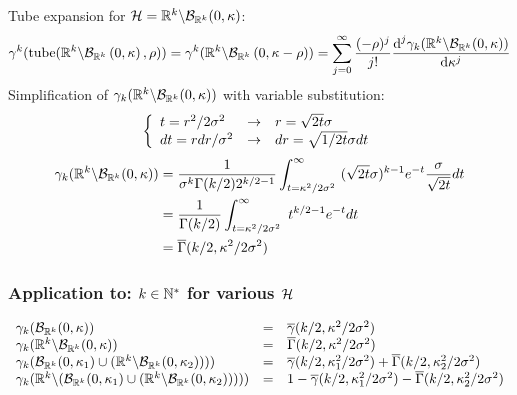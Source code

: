 \documentclass[12pt]{article}
\begin{document}
Tube expansion for $\mathcal{H}=\mathbb{R}^k \backslash \mathcal{B}_{\mathbb{R}^k}(0,\kappa)$:
\begin{equation}
  \gamma^k(\text{tube}(\mathbb{R}^k \backslash \mathcal{B}_{\mathbb{R}^k}\left(0,\kappa\right),\rho))=\gamma^k(\mathbb{R}^k \backslash \mathcal{B}_{\mathbb{R}^k}\left(0,\kappa-\rho\right))=\sum_{j=0}^{\infty} \frac{(-\rho)^j}{j!} \frac{\text{d}^j \gamma_k(\mathbb{R}^k \backslash \mathcal{B}_{\mathbb{R}^k}(0,\kappa))}{\text{d} \kappa^j}
\end{equation}
Simplification of $\gamma_k(\mathbb{R}^k \backslash \mathcal{B}_{\mathbb{R}^k}(0,\kappa))$ with variable substitution:
\begin{equation}
  \left\{
  \begin{array}{lll}
    t = r^2/2\sigma^2 &\rightarrow& r = \sqrt{2t}\sigma \\
    dt = rdr/\sigma^2 &\rightarrow& dr= \sqrt{1/2t}\sigma dt
  \end{array}
  \right.
\end{equation}
\begin{equation}
  \begin{aligned}
    \gamma_k(\Rk \backslash \mathcal{B}_{\Rk}(0,\lset)) & = \frac{1}{\std^k\Gamma(k/2)2^{k/2-1}} \int_{t=\lset^2/2\std^2}^\infty \ (\sqrt{2t}\std)^{k-1} e^{-t} \frac{\std}{\sqrt{2t}} dt\\
                  & = \frac{1}{\Gamma(k/2)} \int_{t=\lset^2/2\std^2}^\infty \ t^{k/2-1} e^{-t} dt\\
                  & = \overline{\Gamma}(k/2,\lset^2/2\std^2)
  \end{aligned}
\end{equation}

\subsubsection{Application to: $k\in\mathbb{N}^*$ for various $\mathcal{H}$}
\begin{equation}
  \begin{array}{lll}
    \gamma_k(\mathcal{B}_{\mathbb{R}^k}(0,\kappa))              &=& \overline{\gamma}(k/2,\kappa^2/2\sigma^2) \\
    \gamma_k(\mathbb{R}^k\backslash\mathcal{B}_{\mathbb{R}^k}(0,\kappa)) &=& \overline{\Gamma}(k/2,\kappa^2/2\sigma^2) \\
    \gamma_k(\mathcal{B}_{\mathbb{R}^k}(0,\kappa_1)\cup(\mathbb{R}^k\backslash\mathcal{B}_{\mathbb{R}^k}(0,\kappa_2)))) &=& \overline{\gamma}(k/2,\kappa_1^2/2\sigma^2) + \overline{\Gamma}(k/2,\kappa_2^2/2\sigma^2) \\
    \gamma_k(\mathbb{R}^k\backslash(\mathcal{B}_{\mathbb{R}^k}(0,\kappa_1)\cup(\mathbb{R}^k\backslash\mathcal{B}_{\mathbb{R}^k}(0,\kappa_2))))) &=& 1-\overline{\gamma}(k/2,\kappa_1^2/2\sigma^2) - \overline{\Gamma}(k/2,\kappa_2^2/2\sigma^2)
  \end{array}
\end{equation}
\end{document}
